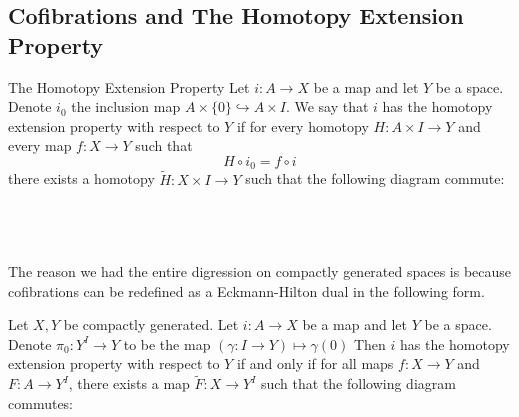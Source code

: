 \documentclass[a4paper]{article}
\begin{document}
\subsection{Cofibrations and The Homotopy Extension Property}
\begin{defn}{The Homotopy Extension Property}{} Let $i:A\to X$ be a map and let $Y$ be a space. Denote $i_0$ the inclusion map $A\times\{0\}\hookrightarrow A\times I$. We say that $i$ has the homotopy extension property with respect to $Y$ if for every homotopy $H:A\times I\to Y$ and every map $f:X\to Y$ such that $$H\circ i_0=f\circ i$$ there exists a homotopy $\widetilde{H}:X\times I\to Y$ such that the following diagram commute: \\~\\
\\~\\
\end{defn}

The reason we had the entire digression on compactly generated spaces is because cofibrations can be redefined as a Eckmann-Hilton dual in the following form. 

\begin{lmm}{}{} Let $X,Y$ be compactly generated. Let $i:A\to X$ be a map and let $Y$ be a space. Denote $\pi_0:Y^I\to Y$ to be the map $(\gamma:I\to Y)\mapsto\gamma(0)$ Then $i$ has the homotopy extension property with respect to $Y$ if and only if for all maps $f:X\to Y$ and $F:A\to Y^I$, there exists a map $\widetilde{F}:X\to Y^I$ such that the following diagram commutes: \\~\\
\\~\\
\end{lmm}
\end{document}
